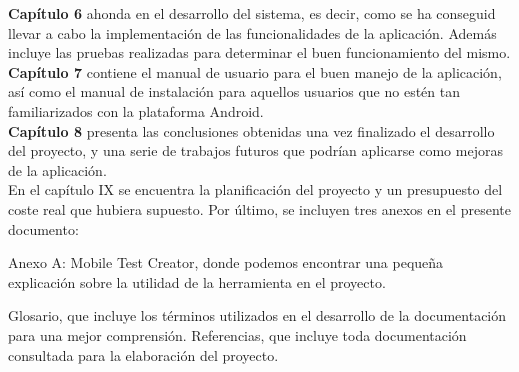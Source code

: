 \documentclass[../pfc.tex]{subfiles}
\begin{document}
  \textbf{Capítulo 6} ahonda en el desarrollo del sistema, es decir, como se ha conseguid llevar a cabo la implementación de las funcionalidades de la aplicación. Además incluye las pruebas realizadas para determinar el buen funcionamiento del mismo.\\
  
  \textbf{Capítulo 7} contiene el manual de usuario para el buen manejo de la aplicación, así como el manual de instalación para aquellos usuarios que no estén tan familiarizados con la plataforma Android.\\
  
  \textbf{Capítulo 8} presenta las conclusiones obtenidas una vez finalizado el desarrollo del proyecto, y una serie de trabajos futuros que podrían aplicarse como mejoras de la aplicación.\\
  
  En el capítulo IX se encuentra la planificación del proyecto y un presupuesto del coste real que hubiera supuesto.
  Por último, se incluyen tres anexos en el presente documento:

  Anexo A: Mobile Test Creator, donde podemos encontrar una pequeña explicación sobre la utilidad de la herramienta en el proyecto.


 Glosario, que incluye los términos utilizados en el desarrollo de la documentación para una mejor comprensión.
 Referencias, que incluye toda documentación consultada para la elaboración del proyecto.
\end{document}
